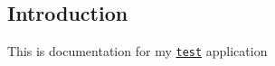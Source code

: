 \subsection*{Introduction}

This is documentation for my \href{https://github.com/danameme/test}{\tt test} application 